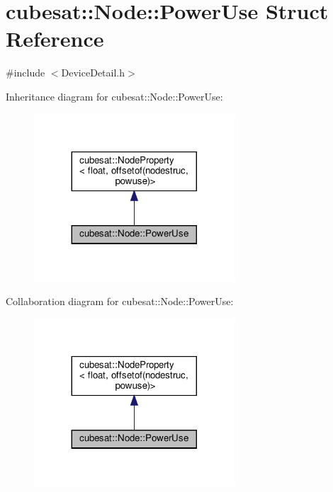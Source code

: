 \hypertarget{structcubesat_1_1Node_1_1PowerUse}{}\section{cubesat\+:\+:Node\+:\+:Power\+Use Struct Reference}
\label{structcubesat_1_1Node_1_1PowerUse}


{\ttfamily \#include $<$Device\+Detail.\+h$>$}



Inheritance diagram for cubesat\+:\+:Node\+:\+:Power\+Use\+:
\nopagebreak
\begin{figure}[H]
\begin{center}
\leavevmode
\includegraphics[width=212pt]{structcubesat_1_1Node_1_1PowerUse__inherit__graph}
\end{center}
\end{figure}


Collaboration diagram for cubesat\+:\+:Node\+:\+:Power\+Use\+:
\nopagebreak
\begin{figure}[H]
\begin{center}
\leavevmode
\includegraphics[width=212pt]{structcubesat_1_1Node_1_1PowerUse__coll__graph}
\end{center}
\end{figure}
